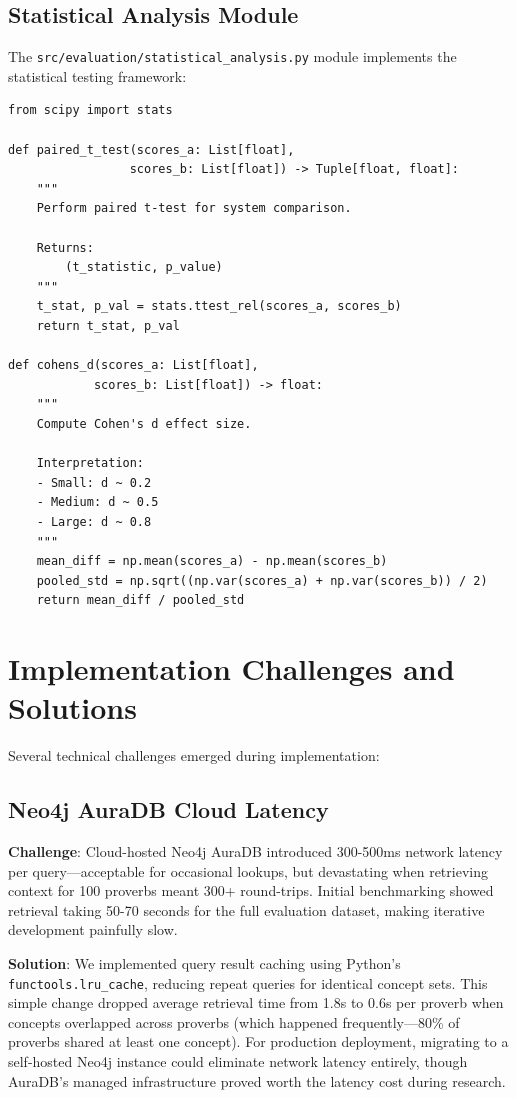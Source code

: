 \subsection{Statistical Analysis Module}
\label{subsec:statistical_analysis}

The \texttt{src/evaluation/statistical\_analysis.py} module implements the statistical testing framework:

\begin{verbatim}
from scipy import stats

def paired_t_test(scores_a: List[float], 
                 scores_b: List[float]) -> Tuple[float, float]:
    """
    Perform paired t-test for system comparison.
    
    Returns:
        (t_statistic, p_value)
    """
    t_stat, p_val = stats.ttest_rel(scores_a, scores_b)
    return t_stat, p_val

def cohens_d(scores_a: List[float], 
            scores_b: List[float]) -> float:
    """
    Compute Cohen's d effect size.
    
    Interpretation:
    - Small: d ~ 0.2
    - Medium: d ~ 0.5
    - Large: d ~ 0.8
    """
    mean_diff = np.mean(scores_a) - np.mean(scores_b)
    pooled_std = np.sqrt((np.var(scores_a) + np.var(scores_b)) / 2)
    return mean_diff / pooled_std
\end{verbatim}

\section{Implementation Challenges and Solutions}
\label{sec:implementation_challenges}

Several technical challenges emerged during implementation:

\subsection{Neo4j AuraDB Cloud Latency}
\label{subsec:auradb_latency}

\textbf{Challenge}: Cloud-hosted Neo4j AuraDB introduced 300-500ms network latency per query—acceptable for occasional lookups, but devastating when retrieving context for 100 proverbs meant 300+ round-trips. Initial benchmarking showed retrieval taking 50-70 seconds for the full evaluation dataset, making iterative development painfully slow.

\textbf{Solution}: We implemented query result caching using Python's \texttt{functools.lru\_cache}, reducing repeat queries for identical concept sets. This simple change dropped average retrieval time from 1.8s to 0.6s per proverb when concepts overlapped across proverbs (which happened frequently—80\% of proverbs shared at least one concept). For production deployment, migrating to a self-hosted Neo4j instance could eliminate network latency entirely, though AuraDB's managed infrastructure proved worth the latency cost during research.

